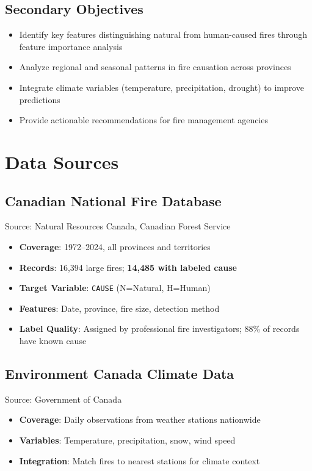 \documentclass[sigconf,nonacm]{acmart}
\begin{document}
\subsection{Secondary Objectives}
\begin{itemize}
    \item Identify key features distinguishing natural from human-caused fires through feature importance analysis
    \item Analyze regional and seasonal patterns in fire causation across provinces
    \item Integrate climate variables (temperature, precipitation, drought) to improve predictions
    \item Provide actionable recommendations for fire management agencies
\end{itemize}

\section{Data Sources}

\subsection{Canadian National Fire Database}
Source: Natural Resources Canada, Canadian Forest Service~\cite{cwfis}

\begin{itemize}
    \item \textbf{Coverage}: 1972--2024, all provinces and territories
    \item \textbf{Records}: 16,394 large fires; \textbf{14,485 with labeled cause}
    \item \textbf{Target Variable}: \texttt{CAUSE} (N=Natural, H=Human)
    \item \textbf{Features}: Date, province, fire size, detection method
    \item \textbf{Label Quality}: Assigned by professional fire investigators; 88\% of records have known cause
\end{itemize}

\subsection{Environment Canada Climate Data}
Source: Government of Canada~\cite{eccc}

\begin{itemize}
    \item \textbf{Coverage}: Daily observations from weather stations nationwide
    \item \textbf{Variables}: Temperature, precipitation, snow, wind speed
    \item \textbf{Integration}: Match fires to nearest stations for climate context
\end{itemize}
\end{document}
